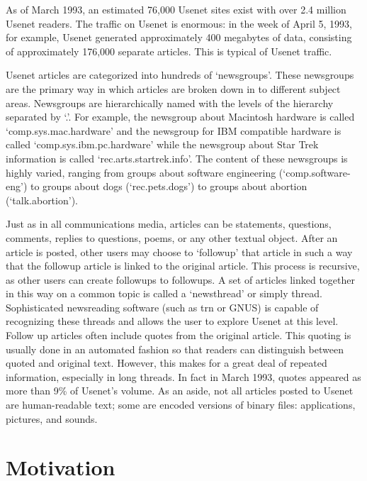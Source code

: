 As of March 1993, an estimated 76,000 Usenet sites exist with over 2.4 million
Usenet readers. The traffic on Usenet is enormous: in
the week of April 5, 1993, for example, Usenet generated approximately 400
megabytes of data, consisting of approximately 176,000 separate articles.  This
is typical of Usenet traffic.

Usenet articles are categorized into hundreds of `newsgroups'. These
newsgroups are the primary way in which articles are broken down in to
different subject areas. Newsgroups are hierarchically named with the levels
of the hierarchy separated by `.'. For example, the newsgroup about
Macintosh hardware is called `comp.sys.mac.hardware' and the newsgroup for
IBM compatible hardware is called `comp.sys.ibm.pc.hardware' while the
newsgroup about Star Trek information is called `rec.arts.startrek.info'.
The content of these newsgroups is highly varied, ranging from groups about
software engineering (`comp.software-eng') to groups about dogs
(`rec.pets.dogs') to groups about abortion (`talk.abortion').

Just as in all communications media, articles can be statements, questions,
comments, replies to questions, poems, or any other textual object. After an
article is posted, other users may choose to `followup' that article in such a
way that the followup article is linked to the original article. This process
is recursive, as other users can create followups to followups. A set of
articles linked together in this way on a common topic is called a `newsthread'
or simply thread. Sophisticated newsreading software (such as trn or GNUS) is
capable of recognizing these threads and allows the user to explore Usenet at
this level. Follow up articles often include quotes from the original article.
This quoting is usually done in an automated fashion so that readers can
distinguish between quoted and original text. However, this makes for a great
deal of repeated information, especially in long threads. In fact in March
1993, quotes appeared as more than 9\% of Usenet's volume. As an aside, not
all articles posted to Usenet are human-readable text; some are encoded
versions of binary files: applications, pictures, and sounds.

\section{Motivation}

